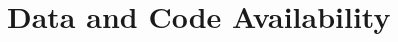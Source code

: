 \documentclass{ieeeaccess}
\begin{document}
\maketitle










\section*{Data and Code Availability}
\end{document}
